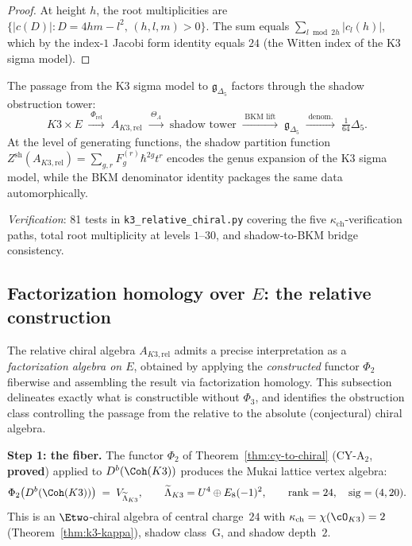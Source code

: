 \begin{proof}
At height $h$, the root multiplicities are $\{|c(D)| : D = 4hm - l^2, \, (h,l,m) > 0\}$. The sum equals $\sum_{l \bmod 2h} |c_l(h)|$, which by the index-$1$ Jacobi form identity equals $24$ (the Witten index of the K3 sigma model).
\end{proof}

\begin{construction}
\label{constr:k3e-shadow-bkm-bridge}
The passage from the K3 sigma model to $\mathfrak{g}_{\Delta_5}$ factors through the shadow obstruction tower:
\[
 K3 \times E \;\xrightarrow{\;\Phi_{\mathrm{rel}}\;}\; A_{K3,\mathrm{rel}} \;\xrightarrow{\;\Theta_A\;}\; \text{shadow tower} \;\xrightarrow{\;\text{BKM lift}\;}\; \mathfrak{g}_{\Delta_5} \;\xrightarrow{\;\text{denom.}\;}\; \tfrac{1}{64}\Delta_5.
\]
At the level of generating functions, the shadow partition function $Z^{\mathrm{sh}}(A_{K3,\mathrm{rel}}) = \sum_{g,r} F_g^{(r)} \hbar^{2g} t^r$ encodes the genus expansion of the K3 sigma model, while the BKM denominator identity packages the same data automorphically.
\end{construction}

\noindent\textit{Verification}: 81 tests in \texttt{k3\_relative\_chiral.py} covering the five $\kappa_{\mathrm{ch}}$-verification paths, total root multiplicity at levels $1$--$30$, and shadow-to-BKM bridge consistency.


\subsection{Factorization homology over $E$: the relative construction}
\label{sec:k3e-relative-fact-hom}

The relative chiral algebra $A_{K3,\mathrm{rel}}$ admits a precise
interpretation as a \emph{factorization algebra on $E$}, obtained by
applying the \emph{constructed} functor $\Phi_2$ fiberwise and
assembling the result via factorization homology.  This subsection
delineates exactly what is constructible without $\Phi_3$, and
identifies the obstruction class controlling the passage from the
relative to the absolute (conjectural) chiral algebra.

\medskip
\noindent\textbf{Step 1: the fiber.}  The functor $\Phi_2$ of
Theorem~\ref{thm:cy-to-chiral} (CY-A$_2$, \textbf{proved}) applied to
$D^b(\Coh(K3))$ produces the Mukai lattice vertex algebra:
\begin{equation}\label{eq:phi2-k3-standalone}
  \Phi_2\bigl(D^b(\Coh(K3))\bigr)
  \;=\;
  V_{\widetilde{\Lambda}_{K3}},
  \qquad
  \widetilde{\Lambda}_{K3} = U^4 \oplus E_8(-1)^2,
  \qquad
  \mathrm{rank} = 24,
  \quad
  \mathrm{sig} = (4,20).
\end{equation}
This is an $\Etwo$-chiral algebra of central charge~$24$ with
$\kappa_{\mathrm{ch}} = \chi(\cO_{K3}) = 2$
(Theorem~\ref{thm:k3-kappa}), shadow class~G, and shadow depth~$2$.

